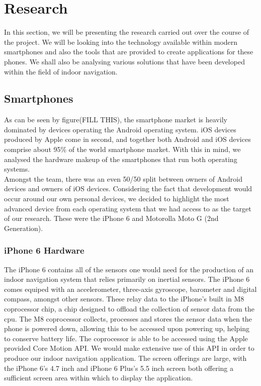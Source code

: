 \documentclass[main.tex]{subfiles}
\begin{document}
\section{Research}

In this section, we will be presenting the research carried out over the course of the project. We will be looking into the technology available within modern smartphones and also the tools that are provided to create applications for these phones. We shall also be analysing various solutions that have been developed within the field of indoor navigation.\\

\subsection{Smartphones}

As can be seen by figure(FILL THIS), the smartphone market is heavily dominated by devices operating the Android operating system. iOS devices produced by Apple come in second, and together both Android and iOS devices comprise about 95\% of the world smartphone market. With this in mind, we analysed the hardware makeup of the smartphones that run both operating systems. \\

Amongst the team, there was an even 50/50 split between owners of Android devices and owners of iOS devices. Considering the fact that development would occur around our own personal devices, we decided to highlight the most advanced device from each operating system that we had access to as the target of our research. These were the iPhone 6 and Motorolla Moto G (2nd Generation).

\subsubsection{iPhone 6 Hardware}

The iPhone 6 contains all of the sensors one would need for the production of an indoor navigation system that relies primarily on inertial sensors. The iPhone 6 comes equiped with an accelerometer, three-axis gyroscope, barometer and digital compass, amongst other sensors. These relay data to the iPhone's built in M8 coprocessor chip, a chip designed to offload the collection of sensor data from the cpu. The M8 coprocessor collects, processes and stores the sensor data when the phone is powered down, allowing this to be accessed upon powering up, helping to conserve battery life. The coprocessor is able to be accessed using the Apple provided Core Motion API. We would make extensive use of this API in order to produce our indoor navigation application. The screen offerings are large, with the iPhone 6's 4.7 inch and iPhone 6 Plus's 5.5 inch screen both offering a sufficient screen area within which to display the application.
\end{document}
